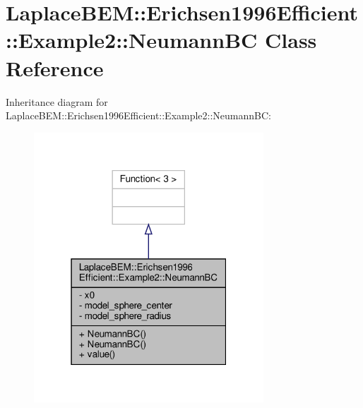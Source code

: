 \hypertarget{classLaplaceBEM_1_1Erichsen1996Efficient_1_1Example2_1_1NeumannBC}{}\section{Laplace\+B\+EM\+:\+:Erichsen1996\+Efficient\+:\+:Example2\+:\+:Neumann\+BC Class Reference}
\label{classLaplaceBEM_1_1Erichsen1996Efficient_1_1Example2_1_1NeumannBC}


Inheritance diagram for Laplace\+B\+EM\+:\+:Erichsen1996\+Efficient\+:\+:Example2\+:\+:Neumann\+BC\+:\nopagebreak
\begin{figure}[H]
\begin{center}
\leavevmode
\includegraphics[width=244pt]{classLaplaceBEM_1_1Erichsen1996Efficient_1_1Example2_1_1NeumannBC__inherit__graph}
\end{center}
\end{figure}


